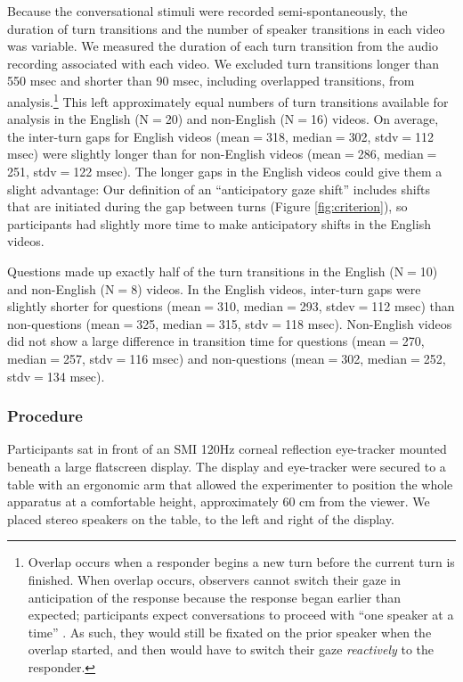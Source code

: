 \documentclass[authoryear, 12pt]{elsarticle}
\begin{document}
Because the conversational stimuli were recorded semi-spontaneously, the duration of turn transitions and the number of speaker transitions in each video was variable. We measured the duration of each turn transition from the audio recording associated with each video. We excluded turn transitions longer than 550 msec and shorter than 90 msec, including overlapped transitions, from analysis.\footnote{Overlap occurs when a responder begins a new turn before the current turn is finished. When overlap occurs, observers cannot switch their gaze in anticipation of the response because the response began earlier than expected; participants expect conversations to proceed with ``one speaker at a time'' \citep{sacks1974}. As such, they would still be fixated on the prior speaker when the overlap started, and then would have to switch their gaze \textit{reactively} to the responder.} This left approximately equal numbers of turn transitions available for analysis in the English (N$=$20) and non-English (N$=$16) videos. On average, the inter-turn gaps for English videos (mean$=$318, median$=$302, stdv$=$112 msec) were slightly longer than for non-English videos (mean$=$286, median$=$251, stdv$=$122 msec). The longer gaps in the English videos could give them a slight advantage: Our definition of an ``anticipatory gaze shift'' includes shifts that are initiated during the gap between turns (Figure \ref{fig:criterion}), so participants had slightly more time to make anticipatory shifts in the English videos.

Questions made up exactly half of the turn transitions in the English (N$=$10) and non-English (N$=$8) videos. In the English videos, inter-turn gaps were slightly shorter for questions (mean$=$310, median$=$293, stdev$=$112 msec) than non-questions (mean$=$325, median$=$315, stdv$=$118 msec). Non-English videos did not show a large difference in transition time for questions (mean$=$270, median$=$257, stdv$=$116 msec) and non-questions (mean$=$302, median$=$252, stdv$=$134 msec).

\subsubsection{Procedure} 
Participants sat in front of an SMI 120Hz corneal reflection eye-tracker mounted beneath a large flatscreen display. The display and eye-tracker were secured to a table with an ergonomic arm that allowed the experimenter to position the whole apparatus at a comfortable height, approximately 60 cm from the viewer. We placed stereo speakers on the table, to the left and right of the display. 
\end{document}
